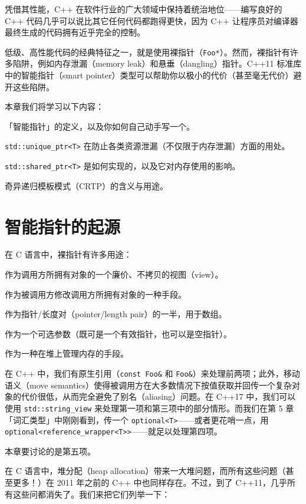凭借其性能，C++ 在软件行业的广大领域中保持着统治地位——编写良好的 C++ 代码几乎可以说比其它任何代码都跑得更快，因为 C++ 让程序员对编译器最终生成的代码拥有近乎完全的控制。

低级、高性能代码的经典特征之一，就是使用裸指针（\texttt{Foo*}）。然而，裸指针有许多陷阱，例如内存泄漏（memory leak）和悬垂（dangling）指针。C++11 标准库中的智能指针（smart pointer）类型可以帮助你以极小的代价（甚至毫无代价）避开这些陷阱。

本章我们将学习以下内容：

「智能指针」的定义，以及你如何自己动手写一个。

\texttt{std::\allowbreak{}unique\_\allowbreak{}ptr<\allowbreak{}T>\allowbreak{}} 在防止各类资源泄漏（不仅限于内存泄漏）方面的用处。

\texttt{std::\allowbreak{}shared\_\allowbreak{}ptr<\allowbreak{}T>\allowbreak{}} 是如何实现的，以及它对内存使用的影响。

奇异递归模板模式（CRTP）的含义与用途。

\section{智能指针的起源}

在 C 语言中，裸指针有许多用途：

作为调用方所拥有对象的一个廉价、不拷贝的视图（view）。

作为被调用方修改调用方所拥有对象的一种手段。

作为指针/长度对（pointer/length pair）的一半，用于数组。

作为一个可选参数（既可是一个有效指针，也可以是空指针）。

作为一种在堆上管理内存的手段。

在 C++ 中，我们有原生引用（\texttt{const Foo\&} 和 \texttt{Foo\&}）来处理前两项；此外，移动语义（move semantics）使得被调用方在大多数情况下按值获取并回传一个复杂对象的代价很低，从而完全避免了别名（aliasing）问题。在 C++17 中，我们可以使用 \texttt{std::\allowbreak{}string\_\allowbreak{}view} 来处理第一项和第三项中的部分情形。而我们在第 5 章「词汇类型」中刚刚看到，传一个 \texttt{optional<\allowbreak{}T>\allowbreak{}}——或者更花哨一点，用 \texttt{optional<\allowbreak{}reference\_\allowbreak{}wrapper<\allowbreak{}T>\allowbreak{}>}——就足以处理第四项。

本章要讨论的是第五项。

在 C 语言中，堆分配（heap allocation）带来一大堆问题，而所有这些问题（甚至更多！）在 2011 年之前的 C++ 中也同样存在。不过，到了 C++11，几乎所有这些问都消失了。我们来把它们列举一下：


